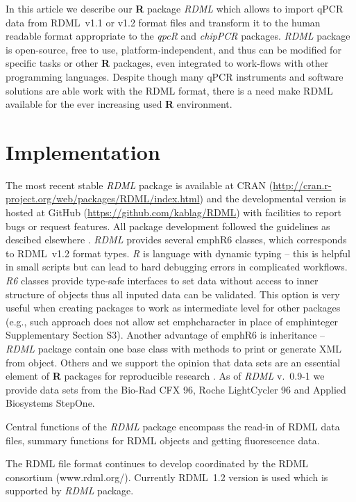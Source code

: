 \documentclass{bioinfo}
\begin{document}
	In this article we describe our \textbf{R} package \textit{RDML} which allows to
	import qPCR data from RDML~v1.1 or v1.2 format files and transform it to the
	human readable format appropriate to the \textit{qpcR} and \textit{chipPCR}
	packages. \textit{RDML} package is open-source, free to use,
	platform-independent, and thus can be modified for specific tasks or other
	\textbf{R} packages, even integrated to work-flows with other programming
	languages. Despite though many qPCR instruments and software solutions are able
	work with the RDML format, there is a need make RDML available for the ever
	increasing used \textbf{R} environment.
	
	\section{Implementation}
	
	The most recent stable \textit{RDML} package is available at CRAN
	(\url{http://cran.r-project.org/web/packages/RDML/index.html}) and the
	developmental version is hosted at GitHub (\url{https://github.com/kablag/RDML})
	with facilities to report bugs or request features. All package development
	followed the guidelines as descibed elsewhere \cite{RDCT2014a}. \textit{RDML}
	provides several emph{R6} classes, which corresponds to RDML~v1.2 format types.
	\emph{R} is language with dynamic typing -- this is helpful in small scripts but
	can lead to hard debugging errors in complicated workflows. \emph{R6} classes
	provide type-safe interfaces to set data without access to inner structure of
	objects thus all inputed data can be validated. This option is very useful when
	creating packages to work as intermediate level for other packages (e.g., such
	approach does not allow set emph{character} in place of emph{integer}
	Supplementary Section S3). Another advantage of emph{R6} is inheritance --
	\textit{RDML} package contain one base class with methods to print or generate
	XML from object. Others and we support the opinion that data sets are an
	essential element of \textbf{R} packages for reproducible research
	\cite{gentleman_2004,hofmann_2013,Leeper_2014}. As of \textit{RDML} v.~0.9-1 we
	provide data sets from the Bio-Rad CFX 96, Roche LightCycler 96 and Applied
	Biosystems StepOne.
	
	Central functions of the \textit{RDML} package encompass the read-in of RDML
	data files, summary functions for RDML objects and getting fluorescence data.
	
	The RDML file format continues to develop coordinated by the RDML consortium
	(www.rdml.org/). Currently RDML~1.2 version is used which is supported by
	\textit{RDML} package.
	
\end{document}
